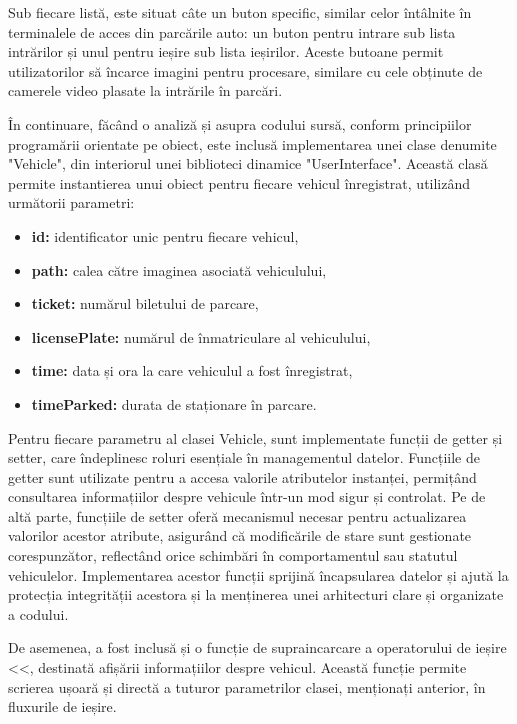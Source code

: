 \documentclass[a4paper,12pt]{report}
\begin{document}
Sub fiecare listă, este situat câte un buton specific, similar celor întâlnite în terminalele de acces din parcările auto: un buton pentru intrare sub lista intrărilor și unul pentru ieșire sub lista ieșirilor. Aceste butoane permit utilizatorilor să încarce imagini pentru procesare, similare cu cele obținute de camerele video plasate la intrările în parcări.

În continuare, făcând o analiză și asupra codului sursă, conform principiilor programării orientate pe obiect, este inclusă implementarea unei clase denumite "Vehicle", din interiorul unei biblioteci dinamice "UserInterface". Această clasă permite instantierea unui obiect pentru fiecare vehicul înregistrat, utilizând următorii parametri:
\begin{itemize}
    \item \textbf{id:} identificator unic pentru fiecare vehicul,
    \item \textbf{path:} calea către imaginea asociată vehiculului,
    \item \textbf{ticket:} numărul biletului de parcare,
    \item \textbf{licensePlate:} numărul de înmatriculare al vehiculului,
    \item \textbf{time:} data și ora la care vehiculul a fost înregistrat,
    \item \textbf{timeParked:} durata de staționare în parcare.
\end{itemize}

Pentru fiecare parametru al clasei Vehicle, sunt implementate funcții de getter și setter, care îndeplinesc roluri esențiale în managementul datelor. Funcțiile de getter sunt utilizate pentru a accesa valorile atributelor instanței, permițând consultarea informațiilor despre vehicule într-un mod sigur și controlat. Pe de altă parte, funcțiile de setter oferă mecanismul necesar pentru actualizarea valorilor acestor atribute, asigurând că modificările de stare sunt gestionate corespunzător, reflectând orice schimbări în comportamentul sau statutul vehiculelor. Implementarea acestor funcții sprijină încapsularea datelor și ajută la protecția integrității acestora și la menținerea unei arhitecturi clare și organizate a codului.

De asemenea, a fost inclusă și o funcție de supraincarcare a operatorului de ieșire <<, destinată afișării informațiilor despre vehicul. Această funcție permite scrierea ușoară și directă a tuturor parametrilor clasei, menționați anterior, în fluxurile de ieșire.
\end{document}
